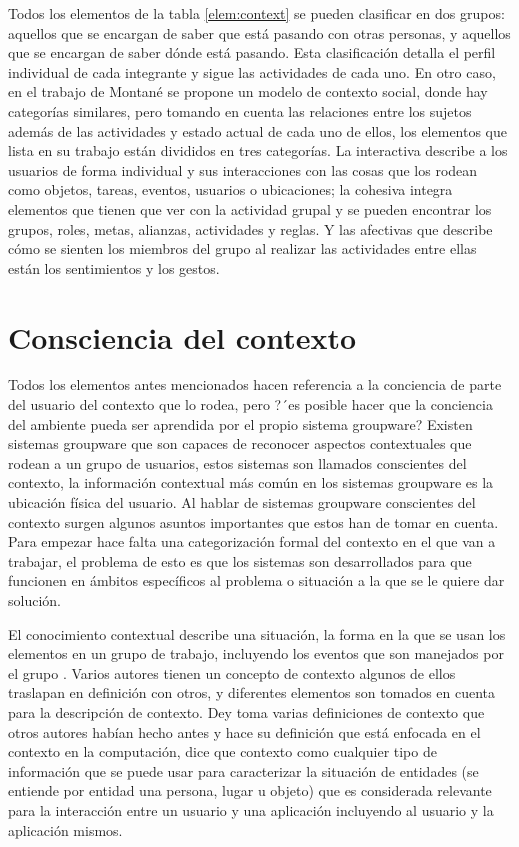 Todos los elementos de la tabla \ref*{elem:context} se pueden clasificar en dos grupos: aquellos que se encargan de saber que est\'a pasando con otras personas, y aquellos que se encargan de saber d\'onde est\'a pasando. Esta clasificaci\'on detalla el perfil individual de cada integrante y sigue las actividades de cada uno. En otro caso, en el trabajo de Montan\'e \cite{montane2013context} se propone un modelo de contexto social, donde hay categor\'ias similares, pero tomando en cuenta las relaciones entre los sujetos adem\'as de las actividades y estado actual de cada uno de ellos, los elementos que lista en su trabajo est\'an divididos en tres categor\'ias. La interactiva describe a los usuarios de forma individual y sus interacciones con las cosas que los rodean como objetos, tareas, eventos, usuarios o ubicaciones; la cohesiva integra elementos que tienen que ver con la actividad grupal y se pueden encontrar los grupos, roles, metas, alianzas, actividades y reglas. Y las afectivas que describe c\'omo se sienten los miembros del grupo al realizar las actividades entre ellas est\'an los sentimientos y los gestos.

\section{Consciencia del contexto}
Todos los elementos antes mencionados hacen referencia a la conciencia de parte del usuario del contexto que lo rodea, pero ?´es posible hacer que la conciencia del ambiente pueda ser aprendida por el propio sistema groupware? Existen sistemas groupware que son capaces de reconocer aspectos contextuales que rodean a un grupo de usuarios, estos sistemas son llamados conscientes del contexto, la informaci\'on contextual m\'as com\'un en los sistemas groupware es la ubicaci\'on f\'isica del usuario. Al hablar de sistemas groupware conscientes del contexto surgen algunos asuntos importantes que estos han de tomar en cuenta. Para empezar hace falta una categorizaci\'on formal del contexto en el que van a trabajar, el problema de esto es que los sistemas son desarrollados para que funcionen en \'ambitos espec\'ificos al problema o situaci\'on a la que se le quiere dar soluci\'on.

El conocimiento contextual describe una situaci\'on, la forma en la que se usan los elementos en un grupo de trabajo, incluyendo los eventos que son manejados por el grupo \cite{brezillon2004context}. Varios autores tienen un concepto de contexto algunos de ellos traslapan en definici\'on con otros, y diferentes elementos son tomados en cuenta para la descripci\'on de contexto. Dey \cite{dey2001conceptual} toma varias definiciones de contexto que otros autores hab\'ian hecho antes y hace su definici\'on que est\'a enfocada en el contexto en la computaci\'on, dice que contexto como cualquier tipo de informaci\'on que se puede usar para caracterizar la situaci\'on de entidades (se entiende por entidad una persona, lugar u objeto) que es considerada relevante para la interacci\'on entre un usuario y una aplicaci\'on incluyendo al usuario y la aplicaci\'on mismos.

